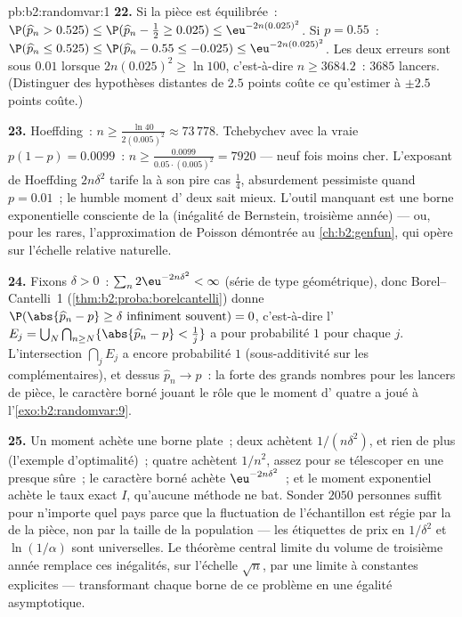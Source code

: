 \begin{solution}{pb:b2:randomvar:1}
\textbf{22.} Si la pièce est équilibrée~: $\P(\widehat p_n > 0.525)
\leq \P(\widehat p_n - \tfrac12 \geq 0.025) \leq
\eu^{-2n(0.025)^2}$. Si $p = 0.55$~: $\P(\widehat p_n \leq
0.525) \leq \P(\widehat p_n - 0.55 \leq -0.025) \leq
\eu^{-2n(0.025)^2}$. Les deux erreurs sont sous $0.01$ lorsque
$2n(0.025)^2 \geq \ln 100$, c'est-à-dire $n \geq 3684.2$~: $3685$
lancers. (Distinguer des hypothèses distantes de $2.5$ points coûte
ce qu'estimer à $\pm2.5$ points coûte.)

\textbf{23.} Hoeffding~: $n \geq \frac{\ln 40}{2(0.005)^2}
\approx 73\,778$. Tchebychev avec la vraie  $p(1-p)
= 0.0099$~: $n \geq \frac{0.0099}{0.05\cdot(0.005)^2} =
7920$ --- neuf fois moins cher. L'exposant de Hoeffding
$2n\delta^2$ tarife la  à son pire cas $\frac14$,
absurdement pessimiste quand $p = 0.01$~; le humble moment
d' deux sait mieux. L'outil manquant est une borne exponentielle
consciente de la  (inégalité de Bernstein, troisième année) --- ou,
pour les  rares, l'approximation de Poisson démontrée au
\cref{ch:b2:genfun}, qui opère sur l'échelle relative naturelle.

\textbf{24.} Fixons $\delta > 0$~: $\sum_n 2\eu^{-2n\delta^2} <
\infty$ (série de type géométrique), donc Borel--Cantelli~1
(\cref{thm:b2:proba:borelcantelli}) donne
$\P(\abs{\widehat p_n - p} \geq \delta \text{ infiniment
souvent}) = 0$, c'est-à-dire l' $E_j =
\bigcup_N\bigcap_{n\geq N}\{\abs{\widehat p_n - p} <
\tfrac1j\}$ a pour probabilité $1$ pour chaque $j$. L'intersection
 $\bigcap_jE_j$ a encore probabilité $1$
(sous-additivité sur les complémentaires), et dessus $\widehat p_n
\to p$~: la  forte des grands nombres pour les lancers de pièce, le
caractère borné jouant le rôle que le moment d' quatre a joué à
l'\cref{exo:b2:randomvar:9}.

\textbf{25.} Un moment achète une borne plate~; deux achètent
$1/(n\delta^2)$, et rien de plus (l'exemple d'optimalité)~; quatre
achètent $1/n^2$, assez pour se télescoper en une  presque sûre~;
le caractère borné achète $\eu^{-2n\delta^2}$~; et le moment
exponentiel  achète le taux exact $I$, qu'aucune méthode
ne bat. Sonder $2050$ personnes suffit pour n'importe quel pays parce que
la fluctuation de l'échantillon est régie par la  de la pièce,
non par la taille de la population --- les étiquettes de prix en $1/\delta^2$ et
$\ln(1/\alpha)$ sont universelles. Le théorème central limite du
volume de troisième année remplace ces inégalités, sur l'échelle
$\sqrt n$, par une  limite  à constantes explicites ---
transformant chaque borne de ce problème en une égalité asymptotique.
\end{solution}
